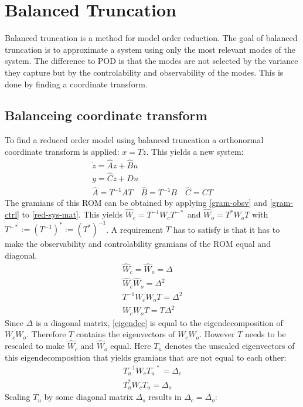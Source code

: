 \section{Balanced Truncation}
Balanced truncation is a method for model order reduction.
The goal of balanced truncation is to approximate a system using only the most relevant modes of the system.
The difference to POD is that the modes are not selected by the variance they capture but by the controlability and observability of the modes.
This is done by finding a coordinate transform.
\subsection{Balanceing coordinate transform}
To find a reduced order model using balanced truncation a orthonormal coordinate transform is applied: \(x = Tz\).
This yields a new system:
\begin{gather}
\dot{z} = \hat{A}z + \hat{B}u \label{z1}\\
y = \hat{C}z + Du \label{z2} \\
\hat{A} = T^{-1}AT \quad \hat{B} = T^{-1}B \quad \hat{C} = CT \label{red-sys-mat}
\end{gather}
The gramians of this ROM can be obtained by applying  \ref{gram-obsv} and \ref{gram-ctrl} to \ref{red-sys-mat}.
This yields \(\hat{W}_c = T^{-1}W_cT^{-*}\) and \(\hat{W}_o = T^{*}W_oT\) with  \(T^{-*} := (T^{-1})^{*} := (T^{*})^{-1}\).
A requirement \(T\) has to satisfy is that it has to make the observability and controlability gramians of the ROM equal and diagonal.
\begin{gather}
\hat{W}_c = \hat{W}_o = \Delta \\
\hat{W}_c \hat{W}_o = \Delta^{2} \\
T^{-1}W_cW_oT = \Delta^{2} \\
W_cW_oT = T\Delta^{2} \label{eigendec}
\end{gather}
Since \(\Delta\) is a diagonal matrix, \ref{eigendec} is equal to the eigendecomposition of \(W_cW_o\).
Therefore \(T\) contains the eigenvectors of \(W_cW_o\).
However \(T\) needs to be rescaled to make \(\hat{W}_c\) and \(\hat{W}_o\) equal.
Here \(T_u\) denotes the unscaled eigenvectors of this eigendecomposition that yields gramians that are not equal to each other:
\begin{gather}
T_u^{-1}W_cT_u^{-*} = \Delta_c \\
T_u^{*}W_cT_u = \Delta_o 
\end{gather}
Scaling \(T_u\) by some diagonal matrix \(\Delta_s\) results in \(\Delta_c = \Delta_o\):
